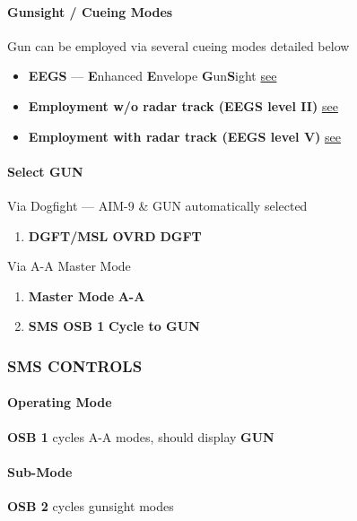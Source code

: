 \paragraph{Gunsight / Cueing Modes} 
Gun can be employed via several cueing modes detailed below

\begin{itemize}
    \item \textbf{EEGS} --- \textbf{E}nhanced \textbf{E}nvelope \textbf{G}un\textbf{S}ight
    \hfill\hyperref[subsec:m61:eegssymb]{see }
    \item \textbf{Employment w/o radar track (EEGS level II)}
    \hfill\hyperref[subsec:m61:eegslvl2]{see }
    \item \textbf{Employment with radar track (EEGS level V)}
    \hfill\hyperref[subsec:m61:eegslvl5]{see }
\end{itemize}

\clearpage

\paragraph{Select GUN}
Via Dogfight --- AIM-9 \& GUN automatically selected

\begin{enumerate}
    \item \textbf{DGFT/MSL OVRD} \dotfill \textbf{DGFT}
\end{enumerate}

Via A-A Master Mode

\begin{enumerate}
    \item \textbf{Master Mode} \dotfill \textbf{A-A}
    \item \textbf{SMS OSB 1} \dotfill \textbf{Cycle to GUN}
\end{enumerate}

\subsubsection{SMS CONTROLS}
\label{subsec:m61:sms}

\paragraph{Operating Mode} 
\textbf{OSB 1} cycles A-A modes, should display \textbf{GUN}
\paragraph{Sub-Mode}
\textbf{OSB 2} cycles gunsight modes

